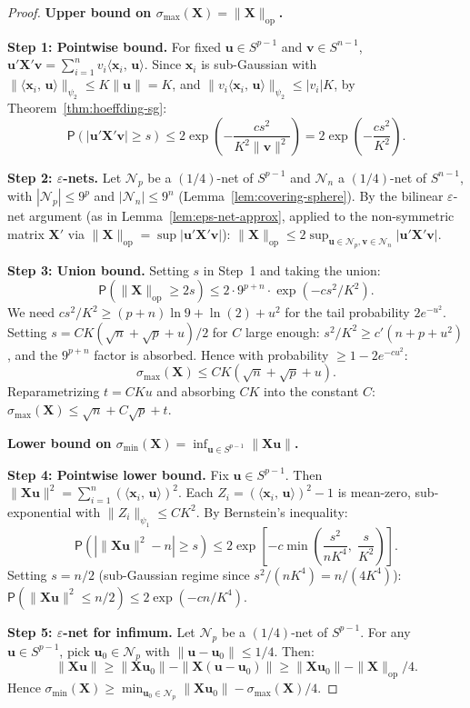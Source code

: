 \documentclass[14pt]{extarticle}
\theoremstyle{plain}
\theoremstyle{definition}
\theoremstyle{remark}
\newcommand\prb{\mathsf{P}}
\newcommand{\bX}{\mathbf{X}}
\newcommand{\bx}{\mathbf{x}}
\newcommand{\bv}{\mathbf{v}}
\newcommand{\bu}{\mathbf{u}}
\newcommand{\calN}{\mathcal{N}}
\newcommand{\ip}[2]{\langle #1,\, #2 \rangle}
\newcommand{\opnorm}[1]{\|#1\|_{\mathrm{op}}}
\begin{document}
\begin{proof}
\textbf{Upper bound on $\sigma_{\max}(\bX) = \opnorm{\bX}$.}

\textbf{Step 1: Pointwise bound.} For fixed $\bu \in S^{p-1}$ and $\bv \in S^{n-1}$, $\bu'\bX'\bv = \sum_{i=1}^n v_i\ip{\bx_i}{\bu}$. Since $\bx_i$ is sub-Gaussian with $\|\ip{\bx_i}{\bu}\|_{\psi_2} \leqslant K\|\bu\| = K$, and $\|v_i\ip{\bx_i}{\bu}\|_{\psi_2} \leqslant |v_i|K$, by Theorem~\ref{thm:hoeffding-sg}:
\[
\prb(|\bu'\bX'\bv| \geqslant s) \leqslant 2\exp\!\left(-\frac{cs^2}{K^2\|\bv\|^2}\right) = 2\exp\!\left(-\frac{cs^2}{K^2}\right).
\]

\textbf{Step 2: $\varepsilon$-nets.} Let $\calN_p$ be a $(1/4)$-net of $S^{p-1}$ and $\calN_n$ a $(1/4)$-net of $S^{n-1}$, with $|\calN_p| \leqslant 9^p$ and $|\calN_n| \leqslant 9^n$ (Lemma~\ref{lem:covering-sphere}). By the bilinear $\varepsilon$-net argument (as in Lemma~\ref{lem:eps-net-approx}, applied to the non-symmetric matrix $\bX'$ via $\opnorm{\bX} = \sup |\bu'\bX'\bv|$): $\opnorm{\bX} \leqslant 2\sup_{\bu \in \calN_p, \bv \in \calN_n}|\bu'\bX'\bv|$.

\textbf{Step 3: Union bound.} Setting $s$ in Step~1 and taking the union:
\[
\prb(\opnorm{\bX} \geqslant 2s) \leqslant 2\cdot 9^{p+n}\cdot\exp(-cs^2/K^2).
\]
We need $cs^2/K^2 \geqslant (p+n)\ln 9 + \ln(2) + u^2$ for the tail probability $2e^{-u^2}$. Setting $s = CK(\sqrt{n} + \sqrt{p} + u)/2$ for $C$ large enough: $s^2/K^2 \geqslant c'(n + p + u^2)$, and the $9^{p+n}$ factor is absorbed. Hence with probability $\geqslant 1 - 2e^{-cu^2}$:
\[
\sigma_{\max}(\bX) \leqslant CK(\sqrt{n} + \sqrt{p} + u).
\]
Reparametrizing $t = CKu$ and absorbing $CK$ into the constant $C$: $\sigma_{\max}(\bX) \leqslant \sqrt{n} + C\sqrt{p} + t$.

\medskip\noindent\textbf{Lower bound on $\sigma_{\min}(\bX) = \inf_{\bu \in S^{p-1}}\|\bX\bu\|$.}

\textbf{Step 4: Pointwise lower bound.} Fix $\bu \in S^{p-1}$. Then $\|\bX\bu\|^2 = \sum_{i=1}^n(\ip{\bx_i}{\bu})^2$. Each $Z_i = (\ip{\bx_i}{\bu})^2 - 1$ is mean-zero, sub-exponential with $\|Z_i\|_{\psi_1} \leqslant CK^2$. By Bernstein's inequality:
\[
\prb\!\left(\left|\|\bX\bu\|^2 - n\right| \geqslant s\right) \leqslant 2\exp\!\left[-c\min\!\left(\frac{s^2}{nK^4},\;\frac{s}{K^2}\right)\right].
\]
Setting $s = n/2$ (sub-Gaussian regime since $s^2/(nK^4) = n/(4K^4)$): $\prb(\|\bX\bu\|^2 \leqslant n/2) \leqslant 2\exp(-cn/K^4)$.

\textbf{Step 5: $\varepsilon$-net for infimum.} Let $\calN_p$ be a $(1/4)$-net of $S^{p-1}$. For any $\bu \in S^{p-1}$, pick $\bu_0 \in \calN_p$ with $\|\bu - \bu_0\| \leqslant 1/4$. Then:
\[
\|\bX\bu\| \geqslant \|\bX\bu_0\| - \|\bX(\bu - \bu_0)\| \geqslant \|\bX\bu_0\| - \opnorm{\bX}/4.
\]
Hence $\sigma_{\min}(\bX) \geqslant \min_{\bu_0 \in \calN_p}\|\bX\bu_0\| - \sigma_{\max}(\bX)/4$.


\end{proof}
\end{document}
